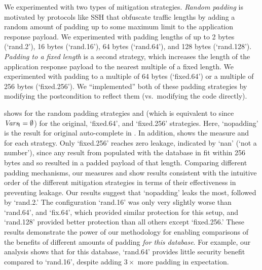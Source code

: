 We experimented with two types of mitigation strategies.
\textit{Random padding} is motivated by protocols like SSH that
obfuscate traffic lengths by adding a random amount of padding up to
some maximum limit to the application response payload.  We
experimented with padding lengths of up to 2 bytes (`rand.2'), 16
bytes (`rand.16'), 64 bytes (`rand.64'), and 128 bytes
(`rand.128').  \textit{Padding to a fixed length} is a second
strategy, which increases the length of the application response
payload to the nearest multiple of a fixed length.  We experimented
with padding to a multiple of 64 bytes (`fixed.64') or a multiple of
256 bytes (`fixed.256').  We ``implemented'' both of these padding
strategies by modifying the postcondition \postcondition{\sphinx}{} to
reflect them (vs.\ modifying the \sphinx code directly).

 shows \JaccardRand{\secretsSetSize}
for the random padding strategies and \Jaccard{\secretsSetSize} (which
is equivalent to \JaccardRand{\secretsSetSize} since $\mathit{Vars_{\mathsf{I}_{}}} =
\emptyset$) for the original, `fixed.64', and `fixed.256' strategies.
Here, `nopadding' is the result for original auto-complete in
\sphinx. In addition,  shows the measure
\secretsSetSizeMinRand{} and \secretsSetSizeMaxRand{} for each
strategy.  Only `fixed.256' reaches zero leakage, indicated by `nan'
(`not a number'), since any result from \sphinx populated with the
database in  fit within 256 bytes and so
resulted in a padded payload of that length.  Comparing different
padding mechanisms, our measures \secretsSetSizeMinRand{} and
\secretsSetSizeMaxRand{} show results consistent with the intuitive
order of the different mitigation strategies in terms of their
effectiveness in preventing leakage.  Our results suggest that
`nopadding' leaks the most, followed by `rand.2.'  The configuration
`rand.16' was only very slightly worse than `rand.64', and `fix.64',
which provided similar protection for this setup, and `rand.128'
provided better protection than all others except `fixed.256.'  These
results demonstrate the power of our methodology for enabling
comparisons of the benefits of different amounts of padding
\textit{for this database}.  For example, our analysis shows that for
this database, `rand.64' provides little security benefit compared to
`rand.16', despite adding $3\times$ more padding in expectation.

